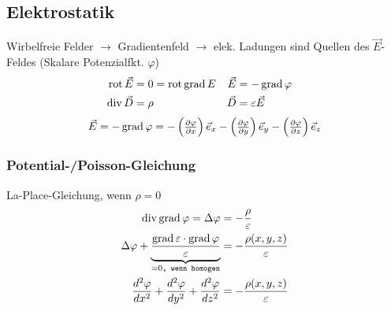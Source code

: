 \subsection{Elektrostatik}


Wirbelfreie Felder $\rightarrow$ Gradientenfeld $\rightarrow$ elek. Ladungen sind Quellen des $\vec{E}$-Feldes (Skalare Potenzialfkt. $ \varphi $)
\begin{align*}
	\operatorname{rot} \vec{E} & = 0 = \operatorname{rot} \operatorname{grad} E & \vec{E} & = -\operatorname{grad} \varphi &\\
	\operatorname{div} \vec{D} & = \rho & \vec{D} & = \varepsilon \vec{E} &
\end{align*}
\begin{equation*}
	\vec{E} = -\operatorname{grad} \varphi = - \left( \tfrac{\partial \varphi}{\partial x}\right) \vec{e}_x - \left( \tfrac{\partial \varphi}{\partial y}\right) \vec{e}_y - \left( \tfrac{\partial \varphi}{\partial z}\right) \vec{e}_z
\end{equation*}


\subsubsection{Potential-/Poisson-Gleichung}
La-Place-Gleichung, wenn $ \rho = 0 $
\begin{align*}
	\operatorname{div} \operatorname{grad} \varphi = \Delta \varphi  &= - \dfrac{\rho}{\varepsilon}\\
    \Delta \varphi + \underbrace{ \dfrac{\operatorname{grad} \varepsilon \cdot \operatorname{grad} \varphi}{\varepsilon}}_{= 0\texttt{, wenn homogen}}
     & = - \dfrac{\rho (x, y, z)}{\varepsilon} \\
    \frac{d^2 \varphi}{d x^2} + \frac{d^2 \varphi}{d y^2} + \frac{d^2 \varphi}{d z^2}
     & = - \dfrac{\rho (x, y, z)}{\varepsilon}
\end{align*}

